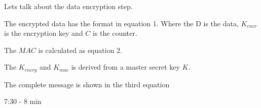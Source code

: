 \tiny
Lets talk about the data encryption step.

The encrypted data has the format in equation 1.
Where the D is the data, $K_{encr}$ is the encryption key and $C$ is the counter.

The $MAC$ is calculated as equation 2.

\bigskip


The $K_{encry}$ and $K_{mac}$ is derived from a master secret key $K$.

The complete message is shown in the third equation

\Large{7:30 - 8 min}